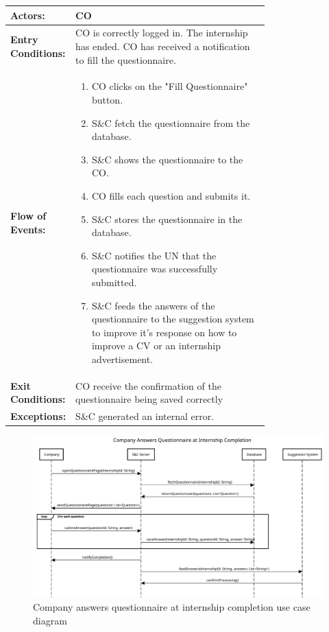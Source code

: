 \begin{center}
    \begin{longtable}{|l|p{0.75\linewidth}|}
        \hline
        \textbf{Actors:}           & CO                                                                                                                \\
        \hline
        \textbf{Entry Conditions:} & CO is correctly logged in. The internship has ended. CO has received a notification to fill the questionnaire.    \\
        \hline
        \textbf{Flow of Events:}   & \begin{enumerate}
            \item CO clicks on the "Fill Questionnaire" button.
            \item S\&C fetch the questionnaire from the database.
            \item S\&C shows the questionnaire to the CO.
            \item CO fills each question and submits it.
            \item S\&C stores the questionnaire in the database.
            \item S\&C notifies the UN that the questionnaire was successfully submitted.
            \item S\&C feeds the answers of the questionnaire to the suggestion system to improve it's response on how to improve a CV or an internship advertisement.                                 
                                     \end{enumerate} \\
        \hline
        \textbf{Exit Conditions:}  & CO receive the confirmation of the questionnaire being saved correctly                                               \\
        \hline
        \textbf{Exceptions:}       & S\&C generated an internal error.                                                                                     \\
        \hline
    \end{longtable}
\end{center}


\begin{figure}[H]
    \centering
    \includegraphics[width=1.0\textwidth]{Images/UC_14.pdf}
    \caption{Company answers questionnaire at internship completion use case diagram}
    \label{fig:use-case-diagram-14}
\end{figure}

